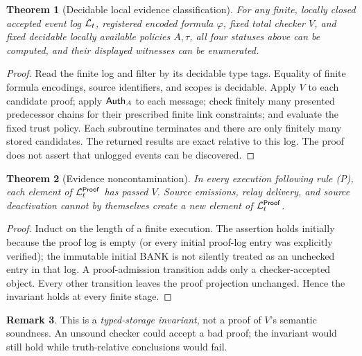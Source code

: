\documentclass[11pt,letterpaper]{article}
\newtheorem{theorem}{Theorem}[section]\newtheorem{lemma}[theorem]{Lemma}\newtheorem{proposition}[theorem]{Proposition}\newtheorem{corollary}[theorem]{Corollary}\theoremstyle{definition}\newtheorem{definition}[theorem]{Definition}\newtheorem{example}[theorem]{Example}\newtheorem{remark}[theorem]{Remark}\newtheorem{conjecture}[theorem]{Conjecture}
\begin{document}
\begin{theorem}[Decidable local evidence classification]
For any finite, locally closed accepted event log $\mathcal L_t$, registered encoded formula $\varphi$, fixed total checker $V$, and fixed decidable locally available policies $A,\tau$, all four statuses above can be computed, and their displayed witnesses can be enumerated.
\end{theorem}
\begin{proof}
Read the finite log and filter by its decidable type tags. Equality of finite formula encodings, source identifiers, and scopes is decidable. Apply $V$ to each candidate proof; apply $\mathsf{Auth}_A$ to each message; check finitely many presented predecessor chains for their prescribed finite link constraints; and evaluate the fixed trust policy. Each subroutine terminates and there are only finitely many stored candidates. The returned results are exact relative to this log. The proof does not assert that unlogged events can be discovered.
\end{proof}

\begin{theorem}[Evidence noncontamination]
In every execution following rule (P), each element of $\mathcal L_t^{\mathsf{Proof}}$ has passed $V$. Source emissions, relay delivery, and source deactivation cannot by themselves create a new element of $\mathcal L_t^{\mathsf{Proof}}$.
\end{theorem}
\begin{proof}
Induct on the length of a finite execution. The assertion holds initially because the proof log is empty (or every initial proof-log entry was explicitly verified); the immutable initial BANK is not silently treated as an unchecked entry in that log. A proof-admission transition adds only a checker-accepted object. Every other transition leaves the proof projection unchanged. Hence the invariant holds at every finite stage.
\end{proof}
\begin{remark}
This is a \emph{typed-storage invariant}, not a proof of $V$'s semantic soundness. An unsound checker could accept a bad proof; the invariant would still hold while truth-relative conclusions would fail.
\end{remark}
\end{document}
